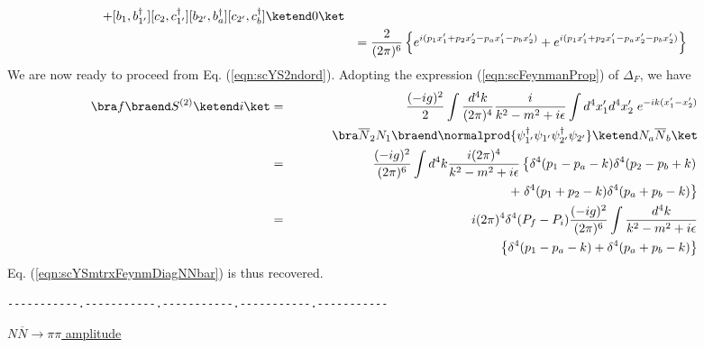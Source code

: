 {\begin{eqnarray}
[c_{2'}, c_b^\dagger]
+
[b_1, b_{1'}^\dagger] 
[c_2, c_{1'}^\dagger] 
[b_{2'}, b_{a}^\dagger]
[c_{2'}, c_b^\dagger]
\ketend 0 \ket
\nonumber\\
&&=
\frac{2}{(2\pi)^6}
\left\{
e^{i(p_1 x_1' + p_2 x_2' - p_a x_1' - p_b x_2')}
+
e^{i(p_1 x_1' + p_2 x_1' - p_a x_2' - p_b x_2')}
\right\}
\nonumber\\
\end{eqnarray}
We are now ready to proceed from Eq. (\ref{eqn:scYS2ndord}).
Adopting the expression (\ref{eqn:scFeynmanProp}) of $\Delta_F$, we have
\begin{eqnarray}
\bra f \braend S^{(2)} \ketend i \ket
&=&
\frac{(-ig)^2}{2} 
\int \frac{d^4 k}{(2\pi)^4} \frac{i}{k^2 - m^2 + i\epsilon}
\int d^4 x_1' d^4 x_2'
\;e^{-ik(x_1' - x_2')}
\nonumber\\
&&
\hspace{10mm}
\bra \overline{N}_2 N_1 \braend 
\normalprod{\psi_{1'}^\dagger \psi_{1'} \psi_{2'}^\dagger \psi_{2'}}
\ketend N_a \overline{N}_b \ket
\nonumber\\
&=&
\frac{(-ig)^2}{(2\pi)^6} 
\int d^4 k \frac{i (2\pi)^4}{k^2 - m^2 + i\epsilon}
\left\{ 
\delta^4(p_1- p_a - k) \delta^4(p_2 - p_b +k)
\right.
\nonumber\\
&&
\hspace{35mm}
+
\left.
\delta^4(p_1+p_2 - k) \delta^4(p_a + p_b - k)
\right\}
\nonumber\\
&=&
 i (2\pi)^4 \delta^4(P_f - P_i) 
\frac{(-ig)^2}{(2\pi)^6}
\int
\frac{d^4 k}{k^2 - m^2 + i\epsilon}
\nonumber\\
&&
\hspace{15mm}
\left\{
\delta^4 (p_1 - p_a - k)
+
\delta^4 (p_a + p_b - k)
\right\}
\end{eqnarray}
Eq. (\ref{eqn:scYSmtrxFeynmDiagNNbar}) is thus recovered.
}\\
\begin{center}
\verb/-----------.-----------.-----------.-----------.-----------/\\
\end{center}

\bigskip
\noindent
\underline{$N\overline{N} \to \pi \pi$ amplitude}

\bigskip


